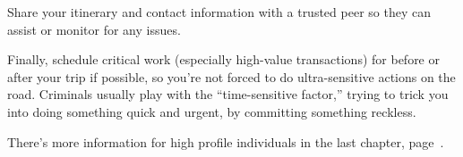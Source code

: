 Share your itinerary and contact information with a
trusted peer so they can assist or monitor for any issues.

Finally, schedule critical work (especially high-value
transactions) for before or after your trip if possible,
so you're not forced to do ultra-sensitive actions on the
road. Criminals usually play with the ``time-sensitive
factor,'' trying to trick you into doing something quick
and urgent, by committing something reckless.

There's more information for high profile individuals in
the last chapter, page~\pageref{ch:high-profile}.
